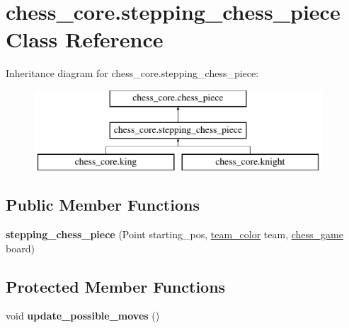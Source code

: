 \hypertarget{classchess__core_1_1stepping__chess__piece}{}\section{chess\+\_\+core.\+stepping\+\_\+chess\+\_\+piece Class Reference}
\label{classchess__core_1_1stepping__chess__piece}
Inheritance diagram for chess\+\_\+core.\+stepping\+\_\+chess\+\_\+piece\+:\begin{figure}[H]
\begin{center}
\leavevmode
\includegraphics[height=3.000000cm]{classchess__core_1_1stepping__chess__piece}
\end{center}
\end{figure}
\subsection*{Public Member Functions}
\begin{DoxyCompactItemize}
\item 
\hypertarget{classchess__core_1_1stepping__chess__piece_a1c467ff3bf4e3107d7dc5788fa4563b8}{}{\bfseries stepping\+\_\+chess\+\_\+piece} (Point starting\+\_\+pos, \hyperlink{enumchess__core_1_1team__color}{team\+\_\+color} team, \hyperlink{classchess__core_1_1chess__game}{chess\+\_\+game} board)\label{classchess__core_1_1stepping__chess__piece_a1c467ff3bf4e3107d7dc5788fa4563b8}

\end{DoxyCompactItemize}
\subsection*{Protected Member Functions}
\begin{DoxyCompactItemize}
\item 
\hypertarget{classchess__core_1_1stepping__chess__piece_a6eac7103a31a0f5fab37455e1d23922a}{}void {\bfseries update\+\_\+possible\+\_\+moves} ()\label{classchess__core_1_1stepping__chess__piece_a6eac7103a31a0f5fab37455e1d23922a}

\end{DoxyCompactItemize}

